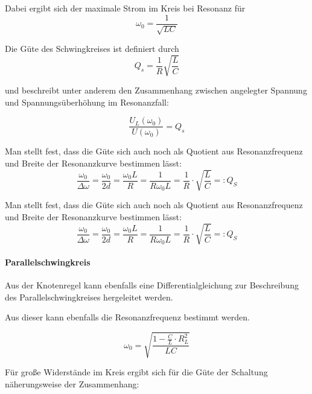 \documentclass[12pt,a4paper]{article}
\begin{document}
Dabei ergibt sich der maximale Strom im Kreis bei Resonanz für
\begin{equation}
\omega_0 = \frac{1}{\sqrt{LC}}
\end{equation} 

Die Güte des Schwingkreises ist definiert durch
\begin{equation}
Q_s = \frac{1}{R} \sqrt{\frac{L}{C}}
\label{equ:Guete_Bauteile_Groesse}
\end{equation}

und beschreibt unter anderem den Zusammenhang zwischen angelegter Spannung und Spannungsüberhöhung im Resonanzfall:

\begin{equation}
\frac{U_L(\omega_0)}{U(\omega_0)} = Q_s 
\label{equ:Guete_Spannungsüberhöhung}
\end{equation}

Man stellt fest, dass die Güte sich auch noch als Quotient aus Resonanzfrequenz und Breite der Resonanzkurve bestimmen lässt:
\begin{equation}
\dfrac{\omega_0}{\Delta \omega} = \dfrac{\omega_0}{2d} = \dfrac{\omega_0 L}{R} = \dfrac{1}{R \omega_0 L} = \dfrac{1}{R} \cdot \sqrt{\dfrac{L}{C}} =: Q_S
\label{equ:Guete_Resonanzbreite}
\end{equation}

Man stellt fest, dass die Güte sich auch noch als Quotient aus Resonanzfrequenz und Breite der Resonanzkurve bestimmen lässt:
\begin{equation}
\dfrac{\omega_0}{\Delta \omega} = \dfrac{\omega_0}{2d} = \dfrac{\omega_0 L}{R} = \dfrac{1}{R \omega_0 L} = \dfrac{1}{R} \cdot \sqrt{\dfrac{L}{C}} =: Q_S
\label{equ:Guete_Bauteile}
\end{equation}

\paragraph{Parallelschwingkreis}
Aus der Knotenregel kann ebenfalls eine Differentialgleichung zur Beschreibung des Parallelschwingkreises hergeleitet werden.

Aus dieser kann ebenfalls die Resonanzfrequenz bestimmt werden.

\begin{equation}
\omega_0 = \sqrt{\frac{1-\frac{C}{L}\cdot R_L^2}{LC}}
\end{equation} 

Für große Widerstände im Kreis ergibt sich für die Güte der Schaltung näherungsweise der Zusammenhang:
\end{document}
